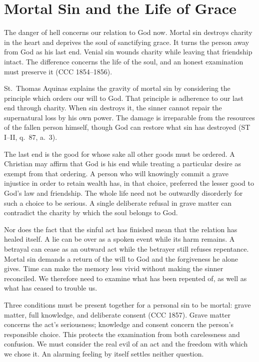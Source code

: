 \section{Mortal Sin and the Life of Grace}

The danger of hell concerns our relation to God now. Mortal sin destroys charity in the heart and deprives the soul of sanctifying grace. It turns the person away from God as his last end. Venial sin wounds charity while leaving that friendship intact. The difference concerns the life of the soul, and an honest examination must preserve it (CCC 1854--1856).

St.~Thomas Aquinas explains the gravity of mortal sin by considering the principle which orders our will to God. That principle is adherence to our last end through charity. When sin destroys it, the sinner cannot repair the supernatural loss by his own power. The damage is irreparable from the resources of the fallen person himself, though God can restore what sin has destroyed (ST I--II, q.~87, a.~3).

The last end is the good for whose sake all other goods must be ordered. A Christian may affirm that God is his end while treating a particular desire as exempt from that ordering. A person who will knowingly commit a grave injustice in order to retain wealth has, in that choice, preferred the lesser good to God's law and friendship. The whole life need not be outwardly disorderly for such a choice to be serious. A single deliberate refusal in grave matter can contradict the charity by which the soul belongs to God.

Nor does the fact that the sinful act has finished mean that the relation has healed itself. A lie can be over as a spoken event while its harm remains. A betrayal can cease as an outward act while the betrayer still refuses repentance. Mortal sin demands a return of the will to God and the forgiveness he alone gives. Time can make the memory less vivid without making the sinner reconciled. We therefore need to examine what has been repented of, as well as what has ceased to trouble us.

Three conditions must be present together for a personal sin to be mortal: grave matter, full knowledge, and deliberate consent (CCC 1857). Grave matter concerns the act's seriousness; knowledge and consent concern the person's responsible choice. This protects the examination from both carelessness and confusion. We must consider the real evil of an act and the freedom with which we chose it. An alarming feeling by itself settles neither question.

